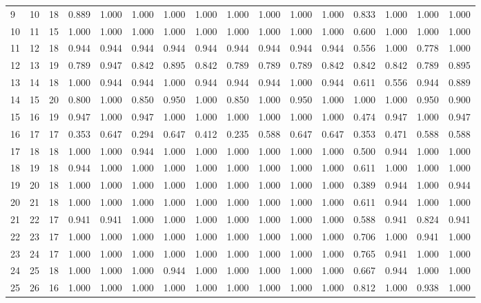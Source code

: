 \begin{longtable}{lrllllllllllllll}
9 & 10 & 18 & 0.889 & 1.000 & 1.000 & 1.000 & 1.000 & 1.000 & 1.000 & 1.000 & 1.000 & 0.833 & 1.000 & 1.000 & 1.000 \\
10 & 11 & 15 & 1.000 & 1.000 & 1.000 & 1.000 & 1.000 & 1.000 & 1.000 & 1.000 & 1.000 & 0.600 & 1.000 & 1.000 & 1.000 \\
11 & 12 & 18 & 0.944 & 0.944 & 0.944 & 0.944 & 0.944 & 0.944 & 0.944 & 0.944 & 0.944 & 0.556 & 1.000 & 0.778 & 1.000 \\
12 & 13 & 19 & 0.789 & 0.947 & 0.842 & 0.895 & 0.842 & 0.789 & 0.789 & 0.789 & 0.842 & 0.842 & 0.842 & 0.789 & 0.895 \\
13 & 14 & 18 & 1.000 & 0.944 & 0.944 & 1.000 & 0.944 & 0.944 & 0.944 & 1.000 & 0.944 & 0.611 & 0.556 & 0.944 & 0.889 \\
14 & 15 & 20 & 0.800 & 1.000 & 0.850 & 0.950 & 1.000 & 0.850 & 1.000 & 0.950 & 1.000 & 1.000 & 1.000 & 0.950 & 0.900 \\
15 & 16 & 19 & 0.947 & 1.000 & 0.947 & 1.000 & 1.000 & 1.000 & 1.000 & 1.000 & 1.000 & 0.474 & 0.947 & 1.000 & 0.947 \\
16 & 17 & 17 & 0.353 & 0.647 & 0.294 & 0.647 & 0.412 & 0.235 & 0.588 & 0.647 & 0.647 & 0.353 & 0.471 & 0.588 & 0.588 \\
17 & 18 & 18 & 1.000 & 1.000 & 0.944 & 1.000 & 1.000 & 1.000 & 1.000 & 1.000 & 1.000 & 0.500 & 0.944 & 1.000 & 1.000 \\
18 & 19 & 18 & 0.944 & 1.000 & 1.000 & 1.000 & 1.000 & 1.000 & 1.000 & 1.000 & 1.000 & 0.611 & 1.000 & 1.000 & 1.000 \\
19 & 20 & 18 & 1.000 & 1.000 & 1.000 & 1.000 & 1.000 & 1.000 & 1.000 & 1.000 & 1.000 & 0.389 & 0.944 & 1.000 & 0.944 \\
20 & 21 & 18 & 1.000 & 1.000 & 1.000 & 1.000 & 1.000 & 1.000 & 1.000 & 1.000 & 1.000 & 0.611 & 0.944 & 1.000 & 1.000 \\
21 & 22 & 17 & 0.941 & 0.941 & 1.000 & 1.000 & 1.000 & 1.000 & 1.000 & 1.000 & 1.000 & 0.588 & 0.941 & 0.824 & 0.941 \\
22 & 23 & 17 & 1.000 & 1.000 & 1.000 & 1.000 & 1.000 & 1.000 & 1.000 & 1.000 & 1.000 & 0.706 & 1.000 & 0.941 & 1.000 \\
23 & 24 & 17 & 1.000 & 1.000 & 1.000 & 1.000 & 1.000 & 1.000 & 1.000 & 1.000 & 1.000 & 0.765 & 0.941 & 1.000 & 1.000 \\
24 & 25 & 18 & 1.000 & 1.000 & 1.000 & 0.944 & 1.000 & 1.000 & 1.000 & 1.000 & 1.000 & 0.667 & 0.944 & 1.000 & 1.000 \\
25 & 26 & 16 & 1.000 & 1.000 & 1.000 & 1.000 & 1.000 & 1.000 & 1.000 & 1.000 & 1.000 & 0.812 & 1.000 & 0.938 & 1.000 \\

\end{longtable}
